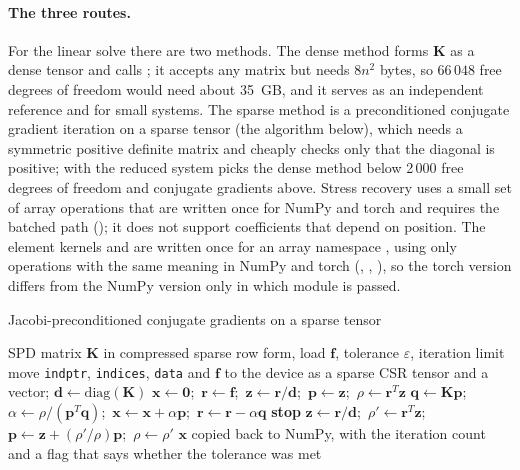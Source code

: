 
\paragraph{The three routes.} For the linear solve there are two methods. The dense method forms $\bm K$ as a dense tensor and calls ; it accepts any matrix but needs $8n^2$ bytes, so $66\,048$ free degrees of freedom would need about 35~GB, and it serves as an independent reference and for small systems. The sparse method is a preconditioned conjugate gradient iteration on a sparse tensor (the algorithm below), which needs a symmetric positive definite matrix and cheaply checks only that the diagonal is positive; with  the reduced system picks the dense method below 2\,000 free degrees of freedom and conjugate gradients above. Stress recovery uses a small set of array operations that are written once for NumPy and torch and requires the batched path (); it does not support coefficients that depend on position. The element kernels  and  are written once for an array namespace , using only operations with the same meaning in NumPy and torch (, , ), so the torch version differs from the NumPy version only in which module is passed.

\begin{algbox}{Jacobi-preconditioned conjugate gradients on a sparse tensor}
\begin{pseudo}
\Require SPD matrix $\bm K$ in compressed sparse row form, load $\bm f$, tolerance $\varepsilon$, iteration limit
\State move \texttt{indptr}, \texttt{indices}, \texttt{data} and $\bm f$ to the device as a sparse CSR tensor and a vector; $\bm d\gets\mathrm{diag}(\bm K)$
\State $\bm x\gets\bm 0$;\ $\bm r\gets\bm f$;\ $\bm z\gets\bm r/\bm d$;\ $\bm p\gets\bm z$;\ $\rho\gets\bm r^T\bm z$
  \State $\bm q\gets\bm K\bm p$;\ $\alpha\gets\rho/(\bm p^T\bm q)$;\ $\bm x\gets\bm x+\alpha\bm p$;\ $\bm r\gets\bm r-\alpha\bm q$
   \textbf{stop} \EndIf
  \State $\bm z\gets\bm r/\bm d$;\ $\rho'\gets\bm r^T\bm z$;\ $\bm p\gets\bm z+(\rho'/\rho)\bm p$;\ $\rho\gets\rho'$
\EndFor
\Ensure $\bm x$ copied back to NumPy, with the iteration count and a flag that says whether the tolerance was met
\end{pseudo}
\end{algbox}


